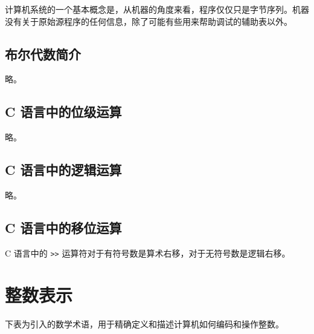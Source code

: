 计算机系统的一个基本概念是，从机器的角度来看，程序仅仅只是字节序列。机器没有关于原始源程序的任何信息，除了可能有些用来帮助调试的辅助表以外。

\subsection{布尔代数简介}

略。

\subsection{C 语言中的位级运算}

略。

\subsection{C 语言中的逻辑运算}

略。

\subsection{C 语言中的移位运算}

C 语言中的 \verb|>>| 运算符对于有符号数是算术右移，对于无符号数是逻辑右移。

\section{整数表示}

下表为引入的数学术语，用于精确定义和描述计算机如何编码和操作整数。

